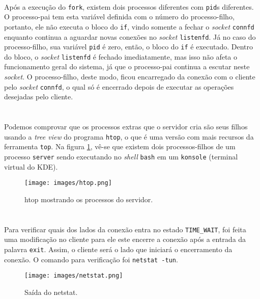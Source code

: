 \documentclass[a4paper,10pt,oneside,final,titlepage,onecolumn]{article}
\begin{document}
\paragraph{}Após a execução do \verb|fork|, existem dois processos diferentes com \verb|pid|s diferentes. O processo-pai tem esta variável definida com o número do processo-filho, portanto, ele não executa o bloco do \verb|if|, vindo somente a fechar o \emph{socket} \verb|connfd| enquanto continua a aguardar novas conexões no \emph{socket} \verb|listenfd|. Já no caso do processo-filho, sua variável \verb|pid| é zero, então, o bloco do \verb|if| é executado. Dentro do bloco, o \emph{socket} \verb|listenfd| é fechado imediatamente, mas isso não afeta o funcionamento geral do sistema, já que o processo-pai continua a escutar neste \emph{socket}. O processo-filho, deste modo, ficou encarregado da conexão com o cliente pelo \emph{socket} \verb|connfd|, o qual só é encerrado depois de executar as operações desejadas pelo cliente.



\FloatBarrier
\section{}
\paragraph{}Podemos comprovar que os processos extras que o servidor cria são seus filhos usando a \emph{tree view} do programa \verb|htop|, o que é uma versão com mais recursos da ferramenta \verb|top|. Na figura \ref{htop}, vê-se que existem dois processos-filhos de um processo \verb|server| sendo executando no \emph{shell} \verb|bash| em um \verb|konsole| (terminal virtual do KDE).
\begin{figure}[!ht]
  \caption{htop mostrando os processos do servidor.}
  \centering
  \texttt{[image: images/htop.png]}
  \label{htop}
\end{figure}



\FloatBarrier
\section{}
\paragraph{}Para verificar quais dos lados da conexão entra no estado \verb|TIME_WAIT|, foi feita uma modificação no cliente para ele este encerre a conexão após a entrada da palavra \verb|exit|. Assim, o cliente será o lado que iniciará o encerramento da conexão. O comando para verificação foi \verb|netstat -tun|.
\begin{figure}[!ht]
  \caption{Saída do netstat.}
  \centering
  \texttt{[image: images/netstat.png]}
  \label{netstat}
\end{figure}
\end{document}
